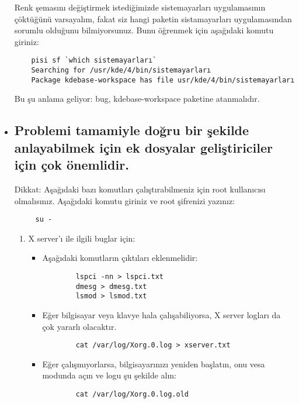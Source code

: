 \documentclass[a4paper,10pt]{article}
\begin{document}
\begin{itemize}
	Renk şemasını değiştirmek istediğimizde sistemayarları uygulamasının  çöktüğünü varsayalım, fakat siz hangi paketin sistamayarları uygulamasından sorumlu olduğunu bilmiyorsunuz. Bunu öğrenmek için aşağıdaki komutu giriniz:
	\begin{verbatim}
	pisi sf `which sistemayarları`
	Searching for /usr/kde/4/bin/sistemayarları
	Package kdebase-workspace has file usr/kde/4/bin/sistemayarları
	\end{verbatim}
	Bu şu anlama geliyor: bug, kdebase-workspace paketine atanmalıdır.

  \item \subsection*{Problemi tamamiyle doğru bir şekilde anlayabilmek için ek dosyalar geliştiriciler için çok önemlidir.}

	Dikkat: Aşağıdaki bazı komutları çalıştırabilmeniz için root kullanıcısı olmalısınız. Aşağıdaki komutu giriniz ve root şifrenizi yazınız:
	\begin{verbatim}
	 su -
	\end{verbatim}

	\begin{enumerate}
	\item X server'ı ile ilgili buglar için:
	\begin{itemize}
		\item Aşağıdaki komutların çıktıları eklenmelidir:
		\begin{verbatim}
		lspci -nn > lspci.txt
		dmesg > dmesg.txt
		lsmod > lsmod.txt
		\end{verbatim}
		\item Eğer bilgisayar veya klavye hala çalışabiliyorsa, X server logları da çok yararlı olacaktır.
		\begin{verbatim}
		cat /var/log/Xorg.0.log > xserver.txt
		\end{verbatim}
		\item Eğer çalışmıyorlarsa, bilgisayarınızı yeniden başlatın, onu vesa modunda açın ve logu şu şekilde alın:
		\begin{verbatim}
		cat /var/log/Xorg.0.log.old
		\end{verbatim}


\end{itemize}
\end{enumerate}
\end{itemize}
\end{document}
